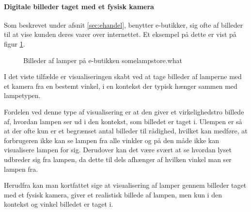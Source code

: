 \paragraph{Digitale billeder taget med et fysisk kamera}
Som beskrevet under afsnit \ref{sec:ehandel}, benytter e-butikker, sig ofte af billeder til at vise kunden deres varer over internettet. Et eksempel på dette er vist på figur \ref{fig:e_handel_lampebilleder}.

\begin{figure}[H]
    \centering
    \fbox{\rule{\textwidth}{5cm}}
    \caption{Billeder af lamper på e-butikken somelampstore.what}
    \label{fig:e_handel_lampebilleder}
\end{figure} 

I det viste tilfælde er visualiseringen skabt ved at tage billeder af lamperne med et kamera fra en bestemt vinkel, i en kontekst der typisk hænger sammen med lampetypen. 

Fordelen ved denne type af visualisering er at den giver et virkelighedstro billede af, hvordan lampen ser ud i den kontekst, som billedet er taget i. Ulempen er så at der ofte kun er et begrænset antal billeder til rådighed, hvilket kan medføre, at forbrugeren ikke kan se lampen fra alle vinkler og på den måde ikke kan visualisere lampen for sig. Derudover kan det være svært at se hvordan lyset udbreder sig fra lampen, da dette til dels afhænger af hvilken vinkel man ser lampen fra. 

Herudfra kan man kortfattet sige at visualisering af lamper gennem billeder taget med et fysisk kamera, giver et realistisk billede af lampen, men kun i den kontekst og vinkel billedet er taget i. 

